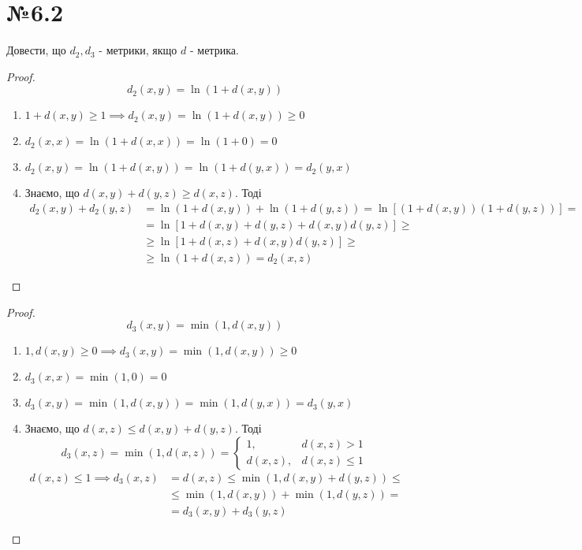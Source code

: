 \documentclass[11pt, a4paper]{article} %
\begin{document}

\section*{№6.2}
\begin{mdframed}
    Довести, що $d_2,d_3$ - метрики, якщо $d$ - метрика.
\end{mdframed}

\begin{proof}
    \[d_2(x,y) = \ln(1 + d(x,y))\]
    \begin{enumerate}
        \item \(1 + d(x,y) \ge 1 \implies d_2(x,y) = \ln (1 + d(x,y)) \ge 0\)
        \item \(d_2(x,x) = \ln(1 + d(x,x)) = \ln(1 + 0) = 0\)
        \item \(d_2(x,y) = \ln(1 + d(x,y)) = \ln(1 + d(y,x)) = d_2(y,x)\)
        \item Знаємо, що \(d(x,y) + d(y,z) \ge d(x,z)\). Тоді
        \begin{align*}
            d_2(x,y) + d_2(y,z) &= \ln(1 + d(x,y)) + \ln(1 + d(y,z)) = \ln\left[(1 + d(x,y))(1 + d(y,z))\right] = \\
            &= \ln\left[1 + d(x,y) + d(y,z) + d(x,y)d(y,z)\right] \ge\\
            &\ge \ln\left[1 + d(x,z) + d(x,y)d(y,z)\right] \ge \\
            &\ge \ln(1 + d(x,z)) = d_2(x,z)
        \end{align*}
    \end{enumerate}
\end{proof}
    
\begin{proof}
    \[d_3(x,y) = \min(1, d(x,y))\]
    \begin{enumerate}
        \item \(1, d(x,y) \ge 0 \implies d_3(x,y) = \min(1, d(x,y)) \ge 0\)
        \item \(d_3(x,x) = \min(1, 0) = 0\)
        \item \(d_3(x,y) = \min(1, d(x,y)) = \min(1, d(y,x)) = d_3(y,x)\)
        \item Знаємо, що \(d(x,z) \le d(x,y) + d(y,z)\). Тоді
        \[d_3(x,z) = \min(1, d(x,z)) = \begin{cases}
            1, & d(x,z) > 1 \\
            d(x,z), & d(x,z) \le 1
        \end{cases}\]
        \begin{align*}
            d(x,z) \le 1 \implies d_3(x,z) &= d(x,z) \le \min(1, d(x,y) + d(y,z)) \le \\
            &\le \min(1, d(x,y)) + \min(1, d(y,z)) = \\
            &= d_3(x,y) + d_3(y,z)
        \end{align*}
    \end{enumerate}
    
\end{proof}
\pagebreak
\end{document}

